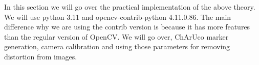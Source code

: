In this section we will go over the practical implementation of the above theory. We will use python 3.11 and opencv-contrib-python 4.11.0.86. The main difference why we are using the contrib version is because it has more features than the regular version of OpenCV. We will go over, ChArUco marker generation, camera calibration and using those parameters for removing distortion from images. 